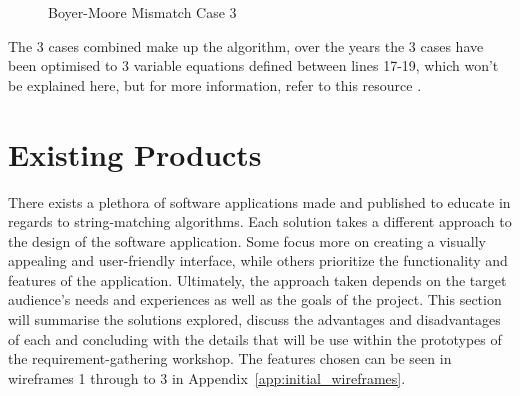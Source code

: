 \begin{figure}[H]
  \centering
  \caption{Boyer-Moore Mismatch Case 3}
  \label{bm:mismatch-case-3}
\end{figure}


The 3 cases combined make up the algorithm, over the years the 3 cases have been optimised to 3 variable equations defined between lines 17-19, which won't be explained here, but for more information, refer to this resource \cite{}.


\section{Existing Products}
\label{bac:existing_products}

There exists a plethora of software applications made and published to educate in regards to  string-matching algorithms. Each solution takes a different approach to the design of the software application. Some focus more on creating a visually appealing and user-friendly interface, while others prioritize the functionality and features of the application. Ultimately, the approach taken depends on the target audience's needs and experiences as well as the goals of the project. This section will summarise the solutions explored, discuss the advantages and disadvantages of each and concluding with the details that will be use within the prototypes of the requirement-gathering workshop. The features chosen can be seen in wireframes 1 through to 3 in Appendix~\ref{app:initial_wireframes}.

